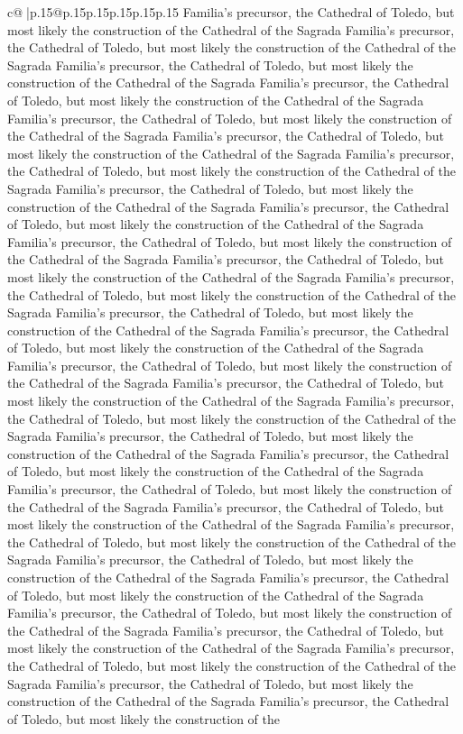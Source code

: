 \documentclass{article}
\begin{document}
{\begin{supertabular}{c@{$\;$}|p{.15\linewidth}@{}p{.15\linewidth}p{.15\linewidth}p{.15\linewidth}p{.15\linewidth}p{.15\linewidth}}
{{{Familia's precursor, the Cathedral of Toledo, but most likely the construction of the Cathedral of the Sagrada Familia's precursor, the Cathedral of Toledo, but most likely the construction of the Cathedral of the Sagrada Familia's precursor, the Cathedral of Toledo, but most likely the construction of the Cathedral of the Sagrada Familia's precursor, the Cathedral of Toledo, but most likely the construction of the Cathedral of the Sagrada Familia's precursor, the Cathedral of Toledo, but most likely the construction of the Cathedral of the Sagrada Familia's precursor, the Cathedral of Toledo, but most likely the construction of the Cathedral of the Sagrada Familia's precursor, the Cathedral of Toledo, but most likely the construction of the Cathedral of the Sagrada Familia's precursor, the Cathedral of Toledo, but most likely the construction of the Cathedral of the Sagrada Familia's precursor, the Cathedral of Toledo, but most likely the construction of the Cathedral of the Sagrada Familia's precursor, the Cathedral of Toledo, but most likely the construction of the Cathedral of the Sagrada Familia's precursor, the Cathedral of Toledo, but most likely the construction of the Cathedral of the Sagrada Familia's precursor, the Cathedral of Toledo, but most likely the construction of the Cathedral of the Sagrada Familia's precursor, the Cathedral of Toledo, but most likely the construction of the Cathedral of the Sagrada Familia's precursor, the Cathedral of Toledo, but most likely the construction of the Cathedral of the Sagrada Familia's precursor, the Cathedral of Toledo, but most likely the construction of the Cathedral of the Sagrada Familia's precursor, the Cathedral of Toledo, but most likely the construction of the Cathedral of the Sagrada Familia's precursor, the Cathedral of Toledo, but most likely the construction of the Cathedral of the Sagrada Familia's precursor, the Cathedral of Toledo, but most likely the construction of the Cathedral of the Sagrada Familia's precursor, the Cathedral of Toledo, but most likely the construction of the Cathedral of the Sagrada Familia's precursor, the Cathedral of Toledo, but most likely the construction of the Cathedral of the Sagrada Familia's precursor, the Cathedral of Toledo, but most likely the construction of the Cathedral of the Sagrada Familia's precursor, the Cathedral of Toledo, but most likely the construction of the Cathedral of the Sagrada Familia's precursor, the Cathedral of Toledo, but most likely the construction of the Cathedral of the Sagrada Familia's precursor, the Cathedral of Toledo, but most likely the construction of the Cathedral of the Sagrada Familia's precursor, the Cathedral of Toledo, but most likely the construction of the Cathedral of the Sagrada Familia's precursor, the Cathedral of Toledo, but most likely the construction of the Cathedral of the Sagrada Familia's precursor, the Cathedral of Toledo, but most likely the construction of the Cathedral of the Sagrada Familia's precursor, the Cathedral of Toledo, but most likely the construction of the Cathedral of the Sagrada Familia's precursor, the Cathedral of Toledo, but most likely the construction of the }}}
\end{supertabular}}
\end{document}
